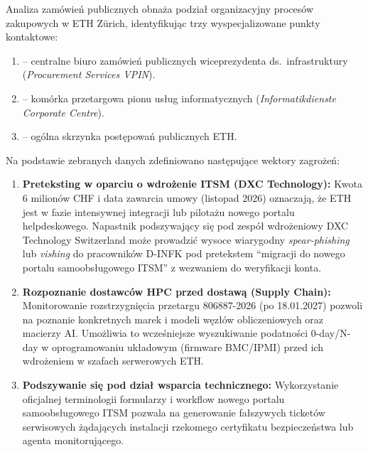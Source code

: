

Analiza zamówień publicznych obnaża podział organizacyjny procesów zakupowych w ETH Zürich, identyfikując trzy wyspecjalizowane punkty kontaktowe:
\begin{enumerate}
    \item {} -- centralne biuro zamówień publicznych wiceprezydenta ds.\ infrastruktury (\textit{Procurement Services VPIN}).
    \item {} -- komórka przetargowa pionu usług informatycznych (\textit{Informatikdienste Corporate Centre}).
    \item {} -- ogólna skrzynka postępowań publicznych ETH.
\end{enumerate}

Na podstawie zebranych danych zdefiniowano następujące wektory zagrożeń:
\begin{enumerate}
    \item \textbf{Preteksting w oparciu o wdrożenie ITSM (DXC Technology):} Kwota 6 milionów CHF i data zawarcia umowy (listopad 2026) oznaczają, że ETH jest w fazie intensywnej integracji lub pilotażu nowego portalu helpdeskowego. Napastnik podszywający się pod zespół wdrożeniowy DXC Technology Switzerland może prowadzić wysoce wiarygodny \textit{spear-phishing} lub \textit{vishing} do pracowników D-INFK pod pretekstem \enquote{migracji do nowego portalu samoobsługowego ITSM} z wezwaniem do weryfikacji konta.
    \item \textbf{Rozpoznanie dostawców HPC przed dostawą (Supply Chain):} Monitorowanie rozstrzygnięcia przetargu 806887-2026 (po 18.01.2027) pozwoli na poznanie konkretnych marek i modeli węzłów obliczeniowych oraz macierzy AI. Umożliwia to wcześniejsze wyszukiwanie podatności 0-day/N-day w oprogramowaniu układowym (firmware BMC/IPMI) przed ich wdrożeniem w szafach serwerowych ETH.
    \item \textbf{Podszywanie się pod dział wsparcia technicznego:} Wykorzystanie oficjalnej terminologii formularzy i workflow nowego portalu samoobsługowego ITSM pozwala na generowanie fałszywych ticketów serwisowych żądających instalacji rzekomego certyfikatu bezpieczeństwa lub agenta monitorującego.
\end{enumerate}

